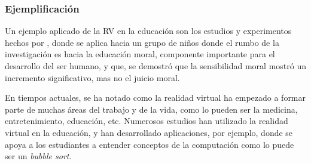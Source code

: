 \subsubsection{Ejemplificación}

Un ejemplo aplicado de la RV en la educación son los estudios y experimentos hechos por \textcite{SHIM2023100010}, donde se aplica hacia un grupo de niños donde el rumbo de la investigación es hacia la educación moral, componente importante para el desarrollo del ser humano, y que, se demostró que la sensibilidad moral mostró un incremento significativo, mas no el juicio moral.

En tiempos actuales, se ha notado como la realidad virtual ha empezado a formar parte de muchas áreas del trabajo y de la vida, como lo pueden ser la medicina, entretenimiento, educación, etc. Numerosos estudios han utilizado la realidad virtual en la educación, y han desarrollado aplicaciones, por ejemplo, donde se apoya a los estudiantes a entender conceptos de la computación como lo puede ser un \textit{bubble sort}. \parencite{OYELERE2023100016} 
